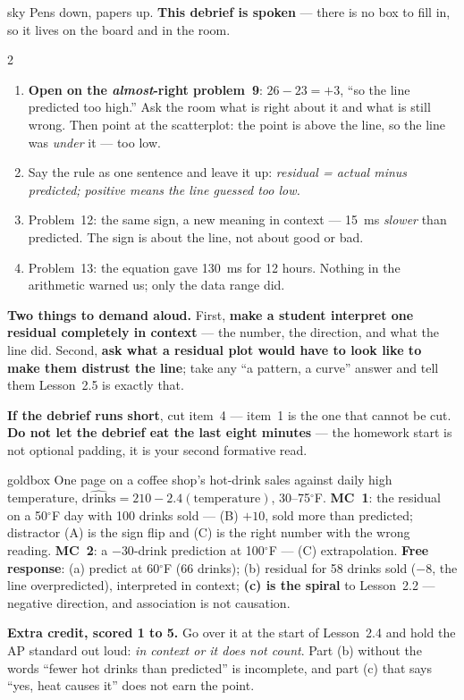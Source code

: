\documentclass[10pt]{article}
\begin{document}
\boxguard
\begin{skillbox}{sky}
Pens down, papers up. \textbf{This debrief is spoken} --- there is no box to fill in, so it lives
on the board and in the room.
\begin{multicols}{2}
\begin{enumerate}[leftmargin=1.3em, nosep, itemsep=3pt]
  \item \textbf{Open on the \emph{almost}-right problem~9}: $26 - 23 = +3$, ``so the line
        predicted too high.'' Ask the room what is right about it and what is still wrong.
        Then point at the scatterplot: the point is above the line, so the line was
        \emph{under} it --- too low.
  \item Say the rule as one sentence and leave it up: \emph{residual = actual minus predicted;
        positive means the line guessed too low.}
  \item Problem~12: the same sign, a new meaning in context --- 15~ms \emph{slower} than
        predicted. The sign is about the line, not about good or bad.
  \item Problem~13: the equation gave 130~ms for 12 hours. Nothing in the arithmetic warned
        us; only the data range did.
\end{enumerate}
\columnbreak
\textbf{Two things to demand aloud.} First, \textbf{make a student interpret one residual
completely in context} --- the number, the direction, and what the line did. Second,
\textbf{ask what a residual plot would have to look like to make them distrust the line}; take
any ``a pattern, a curve'' answer and tell them Lesson~2.5 is exactly that.

\textbf{If the debrief runs short}, cut item~4 --- item~1 is the one that cannot be cut.
\textbf{Do not let the debrief eat the last eight minutes} --- the homework start is not optional
padding, it is your second formative read.
\end{multicols}
\end{skillbox}

\boxguard
\begin{skillbox}{goldbox}
One page on a coffee shop's hot-drink sales against daily high temperature,
$\widehat{\text{drinks}} = 210 - 2.4(\text{temperature})$, 30--75$^\circ$F. \textbf{MC~1}: the
residual on a 50$^\circ$F day with 100 drinks sold --- (B) $+10$, sold more than predicted;
distractor (A) is the sign flip and (C) is the right number with the wrong reading.
\textbf{MC~2}: a $-30$-drink prediction at 100$^\circ$F --- (C) extrapolation. \textbf{Free
response}: (a) predict at 60$^\circ$F (66 drinks); (b) residual for 58 drinks sold ($-8$, the
line overpredicted), interpreted in context; \textbf{(c) is the spiral} to Lesson~2.2 ---
negative direction, and association is not causation.

\textbf{Extra credit, scored 1 to 5.} Go over it at
the start of Lesson~2.4 and hold the AP standard out loud: \emph{in context or it does not
count}. Part (b) without the words ``fewer hot drinks than predicted'' is incomplete, and part
(c) that says ``yes, heat causes it'' does not earn the point.
\end{skillbox}
\end{document}
